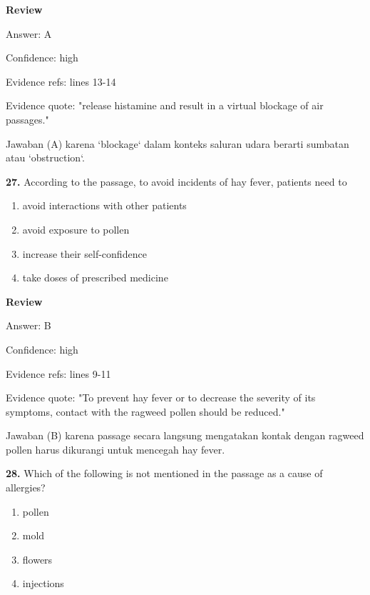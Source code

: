 \documentclass[12pt]{article}
\begin{document}
\par
\begingroup
\setlength{\parskip}{0pt}
\setlength{\parindent}{0pt}
\textbf{Review}\par
Answer: A\par
Confidence: high\par
Evidence refs: lines 13-14\par
Evidence quote: "release histamine and result in a virtual blockage of air passages."\par
Jawaban (A) karena `blockage` dalam konteks saluran udara berarti sumbatan atau `obstruction`.\par
\endgroup
\par
\vspace{0.25\baselineskip}
\noindent\textbf{27.} According to the passage, to avoid incidents of hay fever, patients need to
\begin{enumerate}[label=(\Alph*),leftmargin=*,itemsep=0.2em]
\item avoid interactions with other patients
\item avoid exposure to pollen
\item increase their self-confidence
\item take doses of prescribed medicine
\end{enumerate}
\par
\begingroup
\setlength{\parskip}{0pt}
\setlength{\parindent}{0pt}
\textbf{Review}\par
Answer: B\par
Confidence: high\par
Evidence refs: lines 9-11\par
Evidence quote: "To prevent hay fever or to decrease the severity of its symptoms, contact with the ragweed pollen should be reduced."\par
Jawaban (B) karena passage secara langsung mengatakan kontak dengan ragweed pollen harus dikurangi untuk mencegah hay fever.\par
\endgroup
\par
\vspace{0.25\baselineskip}
\noindent\textbf{28.} Which of the following is not mentioned in the passage as a cause of allergies?
\begin{enumerate}[label=(\Alph*),leftmargin=*,itemsep=0.2em]
\item pollen
\item mold
\item flowers
\item injections
\end{enumerate}
\end{document}
